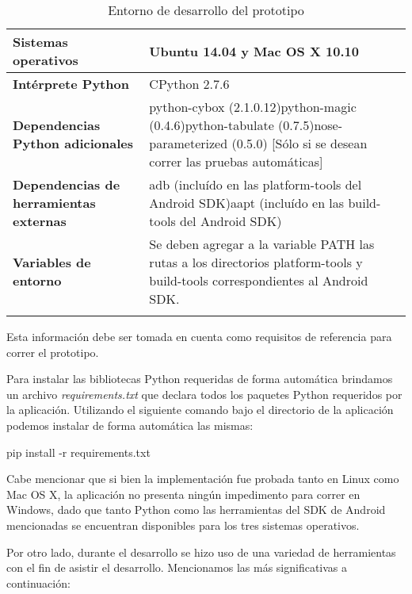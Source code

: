 \footnotesize
    \renewcommand*{\arraystretch}{1.4}
    \begin{longtable}{ | >{\bfseries}m{4.0cm} | m{6.0cm} |}
    \hline
    Sistemas operativos & Ubuntu 14.04 y Mac OS X 10.10 \\ \hline
    Intérprete Python & CPython 2.7.6 \\ \hline
    Dependencias Python adicionales & python-cybox (2.1.0.12)\newline python-magic (0.4.6)\newline python-tabulate (0.7.5)\newline nose-parameterized (0.5.0) [Sólo si se desean correr las pruebas automáticas] \\ \hline
    Dependencias de herramientas externas & adb (incluído en las platform-tools del Android SDK)\newline aapt (incluído en las build-tools del Android SDK) \\ \hline
    Variables de entorno & Se deben agregar a la variable PATH las rutas a los directorios platform-tools y build-tools correspondientes al Android SDK. \\ \hline
    \caption {Entorno de desarrollo del prototipo}
    \end{longtable}
    \normalsize
    
Esta información debe ser tomada en cuenta como requisitos de referencia para correr el prototipo.

Para instalar las bibliotecas Python requeridas de forma automática brindamos un archivo \emph{requirements.txt} que declara todos los paquetes Python requeridos por la aplicación. Utilizando el siguiente comando bajo el directorio de la aplicación podemos instalar de forma automática las mismas:
\newline

\begin{bash}
pip install -r requirements.txt
\end{bash}

Cabe mencionar que si bien la implementación fue probada tanto en Linux como Mac OS X, la aplicación no presenta ningún impedimento para correr en Windows, dado que tanto Python como las herramientas del SDK de Android mencionadas se encuentran disponibles para los tres sistemas operativos.

Por otro lado, durante el desarrollo se hizo uso de una variedad de herramientas con el fin de asistir el desarrollo. Mencionamos las más significativas a continuación:
\newline

